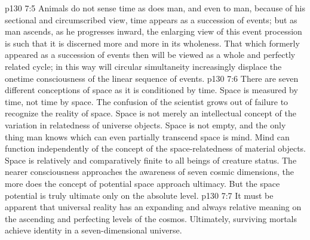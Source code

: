 \vs p130 7:5 Animals do not sense time as does man, and even to man, because of his sectional and circumscribed view, time appears as a succession of events; but as man ascends, as he progresses inward, the enlarging view of this event procession is such that it is discerned more and more in its wholeness. That which formerly appeared as a succession of events then will be viewed as a whole and perfectly related cycle; in this way will circular simultaneity increasingly displace the onetime consciousness of the linear sequence of events.
\vs p130 7:6 There are seven different conceptions of space as it is conditioned by time. Space is measured by time, not time by space. The confusion of the scientist grows out of failure to recognize the reality of space. Space is not merely an intellectual concept of the variation in relatedness of universe objects. Space is not empty, and the only thing man knows which can even partially transcend space is mind. Mind can function independently of the concept of the space\hyp{}relatedness of material objects. Space is relatively and comparatively finite to all beings of creature status. The nearer consciousness approaches the awareness of seven cosmic dimensions, the more does the concept of potential space approach ultimacy. But the space potential is truly ultimate only on the absolute level.
\vs p130 7:7 It must be apparent that universal reality has an expanding and always relative meaning on the ascending and perfecting levels of the cosmos. Ultimately, surviving mortals achieve identity in a seven\hyp{}dimensional universe.
